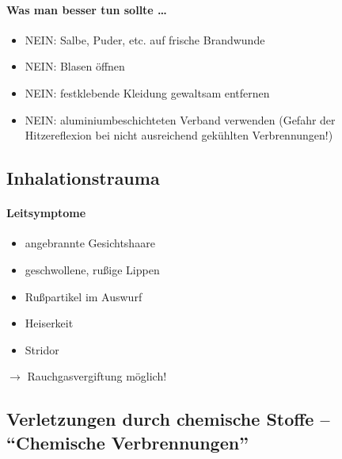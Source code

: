 \paragraph{Was man besser  tun sollte \ldots}

\begin{itemize}
    \item NEIN: Salbe, Puder, etc. auf frische  Brandwunde
    \item NEIN: Blasen \"offnen
    \item NEIN: festklebende Kleidung gewaltsam  entfernen
    \item NEIN: aluminiumbeschichteten Verband  verwenden (Gefahr der
    Hitzereflexion bei  nicht ausreichend gek\"uhlten  Verbrennungen!)
\end{itemize}



\subsection{Inhalationstrauma}

\paragraph{Leitsymptome}

\begin{itemize}
    \item angebrannte Gesichtshaare
    \item geschwollene, ru{\ss}ige Lippen
    \item Ru{\ss}partikel im Auswurf
    \item Heiserkeit
    \item Stridor
\end{itemize}

${\rightarrow}$ Rauchgasvergiftung m\"oglich!











\subsection{Verletzungen durch chemische Stoffe -- "`Chemische Verbrennungen"'}
\label{topic:veraetzung-trauma}

